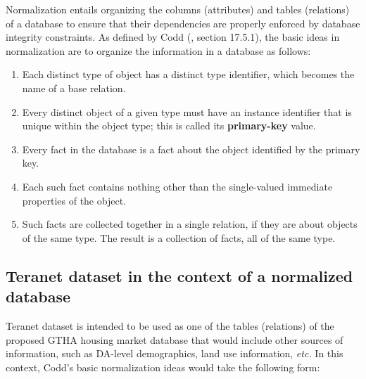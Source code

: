 \documentclass[11pt]{article}
\begin{document}
    Normalization entails organizing the columns (attributes) and tables (relations) of a database to ensure that their dependencies are properly enforced by database integrity constraints.
    As defined by Codd (\cite{Codd1990}, section 17.5.1), the basic ideas in normalization are to organize the information in a database as follows:

    \begin{enumerate}
        \item Each distinct type of object has a distinct type identifier, which becomes the name of a base relation.
        \item Every distinct object of a given type must have an instance identifier that is unique within the object type;
        this is called its \textbf{primary-key} value.
        \item Every fact in the database is a fact about the object identified by the primary key.
        \item Each such fact contains nothing other than the single-valued immediate properties of the object.
        \item Such facts are collected together in a single relation, if they are about objects of the same type.
        The result is a collection of facts, all of the same type.
    \end{enumerate}

    \subsection{Teranet dataset in the context of a normalized database} \label{subsec:teranet_db_norm}

    Teranet dataset is intended to be used as one of the tables (relations) of the proposed GTHA housing market database that would include other sources of information, such as DA-level demographics, land use information, \textit{etc.}
    In this context, Codd's basic normalization ideas would take the following form:
\end{document}

